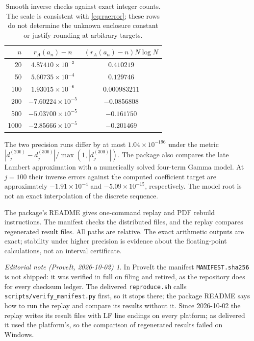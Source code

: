 \documentclass[11pt,letterpaper]{article}
\numberwithin{equation}{section}
\theoremstyle{remark}\newtheorem{remark}[theorem]{Remark}
\newtheorem*{ednote}{Editorial note (ProveIt, 2026-10-02)}
\begin{document}
\begin{table}[ht]
\centering
\begin{tabular}{rcc}
\toprule
$n$ & $r_A(a_n)-n$ & $(r_A(a_n)-n)N\log N$\\
\midrule
20 & $4.87410\times10^{-3}$ & $0.410219$\\
50 & $5.60735\times10^{-4}$ & $0.129746$\\
100 & $1.93015\times10^{-6}$ & $0.000983211$\\
200 & $-7.60224\times10^{-5}$ & $-0.0856808$\\
500 & $-5.03700\times10^{-5}$ & $-0.161750$\\
1000 & $-2.85666\times10^{-5}$ & $-0.201469$\\
\bottomrule
\end{tabular}
\caption{Smooth inverse checks against exact integer counts. The scale is consistent with \eqref{eq:raerror}; these rows do not determine the unknown enclosure constant or justify rounding at arbitrary targets.}\label{tab:inverse}
\end{table}

The two precision runs differ by at most $1.04\times10^{-196}$ under the metric $|d_j^{(200)}-d_j^{(300)}|/\max(1,|d_j^{(300)}|)$. The package also compares the late Lambert approximation with a numerically solved four-term Gamma model. At $j=100$ their inverse errors against the computed coefficient target are approximately $-1.91\times10^{-4}$ and $-5.09\times10^{-15}$, respectively. The model root is not an exact interpolation of the discrete sequence.

The package's README gives one-command replay and PDF rebuild instructions. The manifest checks the distributed files, and the replay compares regenerated result files. All paths are relative. The exact arithmetic outputs are exact; stability under higher precision is evidence about the floating-point calculations, not an interval certificate.

\begin{ednote}
In ProveIt the manifest \texttt{MANIFEST.sha256} is not shipped: it was verified in full on filing and retired, as the repository does for every checksum ledger. The delivered \texttt{reproduce.sh} calls \texttt{scripts/verify\_manifest.py} first, so it stops there; the package README says how to run the replay and compare its results without it. Since 2026-10-02 the replay writes its result files with LF line endings on every platform; as delivered it used the platform's, so the comparison of regenerated results failed on Windows.
\end{ednote}
\end{document}
